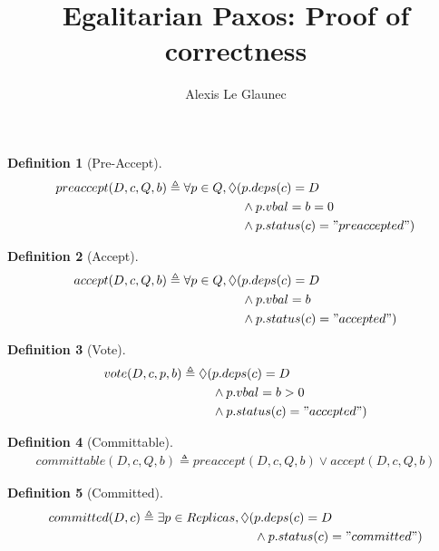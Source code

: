 \documentclass[a4paper]{article}
\title{Egalitarian Paxos: Proof of correctness}
\author{Alexis Le Glaunec}
\theoremstyle{definition}
\newtheorem{definition}{Definition}
\theoremstyle{plain}
\begin{document}
\maketitle




\begin{definition}[Pre-Accept]
\begin{align*}
preaccept(D,c,Q,b) \triangleq \forall p \in Q, \lozenge( & p.deps(c)=D \\
                                                         & \wedge p.vbal=b=0 \\
                                                         & \wedge p.status(c) = "preaccepted")
\end{align*}
\end{definition}

\begin{definition}[Accept]
\begin{align*}
    accept(D,c,Q,b) \triangleq \forall p \in Q, \lozenge( & p.deps(c)=D \\
                                                             &\wedge p.vbal=b \\
                                                             &\wedge p.status(c) = "accepted")
\end{align*}
\end{definition}

\begin{definition}[Vote]
\begin{align*}
    vote(D,c,p,b) \triangleq  \lozenge( & p.deps(c)=D \\
                                                             &\wedge p.vbal=b > 0 \\
                                                             &\wedge p.status(c) = "accepted")
\end{align*}
\end{definition}


\begin{definition}[Committable]
\begin{align*}
    committable(D,c,Q,b) \triangleq  preaccept(D,c,Q,b) \vee accept(D,c,Q,b)
\end{align*}
\end{definition}

\begin{definition}[Committed]
\begin{align*}
    committed(D,c) \triangleq  \exists p \in Replicas, \lozenge(& p.deps(c) = D \\
                                                                &\wedge p.status(c) = "committed") 
\end{align*}

\end{definition}
\end{document}
